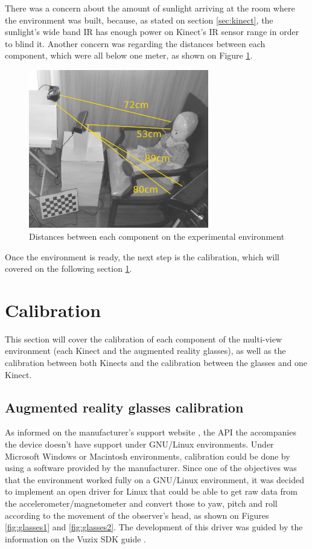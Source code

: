 \documentclass[msc, a4paper, classic, en]{ufbathesis}
\begin{document}
There was a concern about the amount of sunlight arriving at the room where the environment was built, because, as stated on section \ref{sec:kinect}, the sunlight's wide band IR has enough power on Kinect's IR sensor range in order to blind it. Another concern was regarding the distances between each component, which were all below one meter, as shown on Figure \ref{fig:expenv3}.

\begin{figure}
\centering
\includegraphics[width=0.7\textwidth]{images/expenv3.png}
\caption{Distances between each component on the experimental environment}
\label{fig:expenv3}
\end{figure}

Once the environment is ready, the next step is the calibration, which will covered on the following section \ref{sec:calibration}.

\section{Calibration}
\label{sec:calibration}

This section will cover the calibration of each component of the multi-view environment (each Kinect and the augmented reality glasses), as well as the calibration between both Kinects and the calibration between the glasses and one Kinect.

\subsection{Augmented reality glasses calibration}
\label{sec:glasses}

As informed on the manufacturer's support website \cite{vuzixsupport}, the API the accompanies the device doesn't have support under GNU/Linux environments. Under Microsoft Windows or Macintosh environments, calibration could be done by using a software provided by the manufacturer. Since one of the objectives was that the environment worked fully on a GNU/Linux environment, it was decided to implement an open driver for Linux that could be able to get raw data from the accelerometer/magnetometer and convert those to yaw, pitch and roll according to the movement of the observer's head, as shown on Figures \ref{fig:glasses1} and \ref{fig:glasses2}. The development of this driver was guided by the information on the Vuzix SDK guide \cite{vuzixsdk}.
\end{document}
